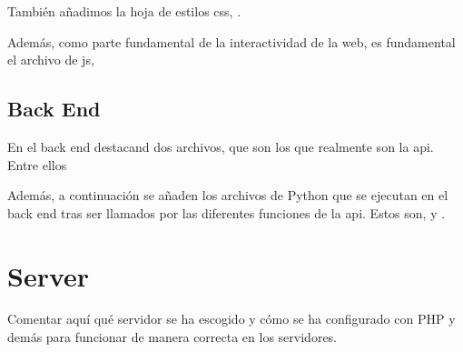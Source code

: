 También añadimos la hoja de estilos \acs{css}, .


Además, como parte fundamental de la interactividad de la web, es fundamental
el archivo de \acs{js}, 



\subsection{Back End}\label{sec:code-back}

En el back end destacand dos archivos, que son los que realmente son la
\gls{api}. Entre ellos




Además, a continuación se añaden los archivos de Python que se ejecutan en el
back end tras ser llamados por las diferentes funciones de la \gls{api}. Estos
son,  y .





\section{Server}
Comentar aquí qué servidor se ha escogido y cómo se ha configurado con PHP y
demás para funcionar de manera correcta en los servidores.



